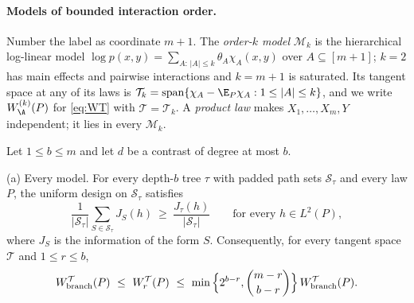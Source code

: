 \paragraph{Models of bounded interaction order.}
Number the label as coordinate $m+1$. The \emph{order-$k$ model}
$\mathcal M_k$ is the hierarchical log-linear model
$\log p(x,y)=\sum_{A:\,|A|\le k}\theta_A\chi_A(x,y)$ over
$A\subseteq[m+1]$; $k=2$ has main effects and pairwise interactions and
$k=m+1$ is saturated. Its tangent space at any of its laws is
$\mathcal T_k=\mathrm{span}\{\chi_A-\E_P\chi_A:1\le|A|\le k\}$, and we write
$W^{(k)}_\A(P)$ for \eqref{eq:WT} with $\mathcal T=\mathcal T_k$. A
\emph{product law} makes $X_1,\ldots,X_m,Y$ independent; it lies in every
$\mathcal M_k$.

\begin{theorem}\label{thm:structuredfull}
Let $1\le b\le m$ and let $d$ be a contrast of degree at most $b$.

\textup{(a) Every model.} For every depth-$b$ tree $\tau$ with padded path
sets $\mathcal S_\tau$ and every law $P$, the uniform design on
$\mathcal S_\tau$ satisfies
\begin{equation}
 \frac1{|\mathcal S_\tau|}\sum_{S\in\mathcal S_\tau}J_S(h)\ \ge\ \frac{J_\tau(h)}{|\mathcal S_\tau|}
 \qquad\text{for every }h\in L^2(P),\label{eq:infodom}
\end{equation}
where $J_S$ is the information of the form $S$. Consequently, for every
tangent space $\mathcal T$ and $1\le r\le b$,
\[
 W^{\mathcal T}_{\rm branch}(P)\ \le\ W^{\mathcal T}_r(P)\ \le\ \min\Big\{2^{b-r},\binom{m-r}{b-r}\Big\}\,W^{\mathcal T}_{\rm branch}(P).
\]


\end{theorem}
